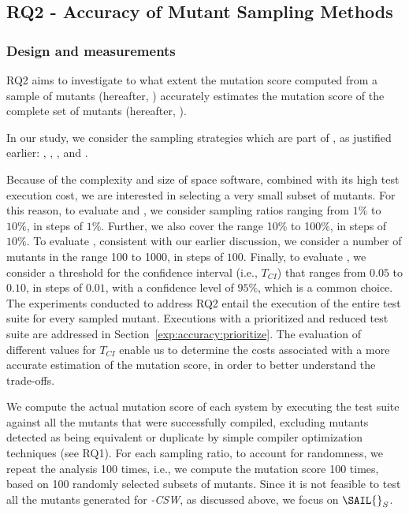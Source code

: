 \subsection{RQ2 - Accuracy of Mutant Sampling Methods}
\label{sec:RQ2}
\subsubsection{Design and measurements}


RQ2 aims to investigate  
to what extent the mutation score computed from a sample of mutants (hereafter, ) accurately estimates the mutation score of the complete set of mutants (hereafter, ).

In our study, we consider the sampling strategies which are part of \APPR, as justified earlier: , ,  , and . 


Because of the complexity and size of space software, combined with its high test execution cost, we are interested in selecting a very small subset of mutants. 
For this reason, 
to evaluate   and ,
we consider sampling ratios ranging from $1\%$ to $10\%$, in steps of $1\%$. Further,
 we also cover the range 10\% to 100\%, in steps of $10\%$. To evaluate  , consistent with our earlier discussion, we consider a number of mutants in the range 100 to 1000, in steps of $100$.
Finally, to evaluate , we consider a threshold for the confidence interval (i.e., $T_{\mathit{CI}}$) that ranges from $0.05$ to $0.10$, in steps of $0.01$, with a confidence level of $95\%$, which is a common choice. The experiments conducted to address RQ2 entail the execution of the entire test suite for every sampled mutant. Executions with a prioritized and reduced test suite are addressed in Section~\ref{exp:accuracy:prioritize}. The evaluation of different values for $T_{\mathit{CI}}$ enable us to determine the costs associated with a more accurate estimation of the mutation score, in order to better understand the trade-offs.


We compute the actual mutation score of each system by executing the test suite against all the mutants that were successfully compiled, excluding mutants detected as being equivalent or duplicate by simple compiler optimization techniques (see RQ1). 
For each sampling ratio, to account for randomness,
we repeat the analysis 100 times, i.e., we compute the mutation score 100 times, based on 100 randomly selected subsets of mutants.
Since it is not feasible to test all the mutants generated for \SAIL{}\emph{-CSW}, as discussed above, we focus on $\mathit{\SAIL{}}_{S}$.



